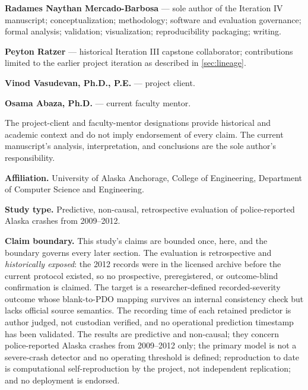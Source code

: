 \documentclass[11pt,letterpaper]{article}
\begin{document}
\begin{list}{}{\setlength{\leftmargin}{0.32in}\setlength{\itemsep}{4pt}\singlespacing}
\item \textbf{Radames Naythan Mercado-Barbosa} --- sole author of the Iteration IV manuscript; conceptualization; methodology; software and evaluation governance; formal analysis; validation; visualization; reproducibility packaging; writing.
\item \textbf{Peyton Ratzer} --- historical Iteration III capstone collaborator; contributions limited to the earlier project iteration as described in \cref{sec:lineage}.
\item \textbf{Vinod Vasudevan, Ph.D., P.E.} --- project client.
\item \textbf{Osama Abaza, Ph.D.} --- current faculty mentor.
\end{list}

The project-client and faculty-mentor designations provide historical and academic context and do not imply endorsement of every claim. The current manuscript's analysis, interpretation, and conclusions are the sole author's responsibility.

\vspace{0.20in}
\noindent\textbf{Affiliation.} University of Alaska Anchorage, College of Engineering, Department of Computer Science and Engineering.

\noindent\textbf{Study type.} Predictive, non-causal, retrospective evaluation of police-reported Alaska crashes from 2009--2012.

\vspace{0.20in}
\noindent\textbf{Claim boundary.} This study's claims are bounded once, here, and the boundary governs every later section. The evaluation is retrospective and \emph{historically exposed}: the 2012 records were in the licensed archive before the current protocol existed, so no prospective, preregistered, or outcome-blind confirmation is claimed. The target is a researcher-defined recorded-severity outcome whose blank-to-PDO mapping survives an internal consistency check but lacks official source semantics. The recording time of each retained predictor is author judged, not custodian verified, and no operational prediction timestamp has been validated. The results are predictive and non-causal; they concern police-reported Alaska crashes from 2009--2012 only; the primary model is not a severe-crash detector and no operating threshold is defined; reproduction to date is computational self-reproduction by the project, not independent replication; and no deployment is endorsed.
\end{document}
